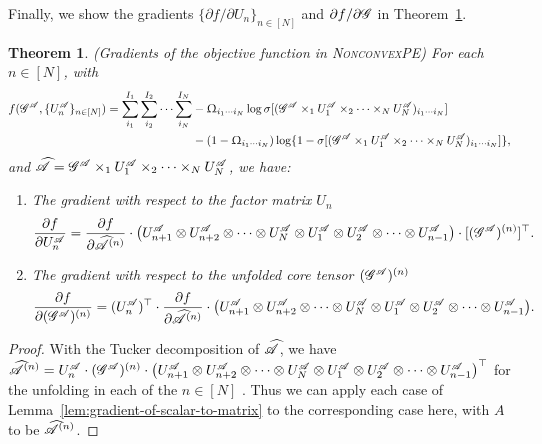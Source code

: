 \documentclass{article}
\newcommand{\T}[2][]{#1\mathscr{\MakeUppercase{#2}}}
\theoremstyle{plain}
\newtheorem{theorem}{Theorem}
\begin{document}
Finally, we show the gradients $\{\partial f / \partial U_n\}_{n \in [N]}$ and $\partial f / \partial \T{G}$ in Theorem~\ref{thm:gradient-of-f}.
\begin{theorem}(Gradients of the objective function in \textsc{NonconvexPE})
	\label{thm:gradient-of-f}
	For each $n \in [N]$, with 
	\begin{equation}
		\begin{aligned}
			f (\T{G}^{\T{A}}, \{U_n^{\T{A}}\}_{n \in [N]}) = \sum_{i_1}^{I_1} \sum_{i_2}^{I_2} \cdots \sum_{i_N}^{I_N} & -\Upomega_{i_1 \cdots i_N} \log \sigma[(\T{G}^{\T{A}} \times_1 U_1^{\T{A}} \times_2 \cdots \times_N U_N^{\T{A}})_{i_1 \cdots i_N}] \\
			& -(1-\Upomega_{i_1 \cdots i_N})\log\{1-\sigma[(\T{G}^{\T{A}} \times_1 U_1^{\T{A}} \times_2 \cdots \times_N U_N^{\T{A}})_{i_1 \cdots i_N}]\},
		\end{aligned}
		\nonumber
	\end{equation}
	and $\widehat{\T{A}} = \T{G}^{\T{A}} \times_1 U_1^{\T{A}} \times_2 \cdots \times_N U_N^{\T{A}}$, we have:
	\begin{enumerate}
		\item The gradient with respect to the factor matrix $U_n$
		\begin{equation}
			\begin{aligned}
				\frac{\partial f}{\partial U_n^{\T{A}}} = \frac{\partial f}{\partial \widehat{\T{A}}^{(n)}} \cdot \big(U_{n+1}^{\T{A}} \otimes U_{n+2}^{\T{A}} \otimes \cdots \otimes U_{N}^{\T{A}} \otimes U_1^{\T{A}} \otimes U_2^{\T{A}} \otimes \cdots \otimes U_{n-1}^{\T{A}} \big) \cdot [(\T{G}^{\T{A}})^{(n)}]^\top.
				\nonumber
			\end{aligned}
		\end{equation}
		\item The gradient with respect to the unfolded core tensor $(\T{G}^{\T{A}})^{(n)}$
		\begin{equation}
			\begin{aligned}
				\frac{\partial f}{\partial (\T{G}^{\T{A}})^{(n)}} = (U_n^{\T{A}})^\top \cdot \frac{\partial f}{\partial \widehat{\T{A}}^{(n)}} \cdot \big(U_{n+1}^{\T{A}} \otimes U_{n+2}^{\T{A}} \otimes \cdots \otimes U_{N}^{\T{A}} \otimes U_1^{\T{A}} \otimes U_2^{\T{A}} \otimes \cdots \otimes U_{n-1}^{\T{A}} \big).
			\end{aligned}
			\nonumber
		\end{equation}
	\end{enumerate}
\end{theorem}
\begin{proof}
	With the Tucker decomposition of $\widehat{\T{A}}$, we have $\widehat{\T{A}}^{(n)} = U_n^{\T{A}} \cdot (\T{G}^{\T{A}})^{(n)} \cdot \big(U_{n+1}^{\T{A}} \otimes U_{n+2}^{\T{A}} \otimes \cdots \otimes U_{N}^{\T{A}} \otimes U_1^{\T{A}} \otimes U_2^{\T{A}} \otimes \cdots \otimes U_{n-1}^{\T{A}} \big)^\top$ for the unfolding in each of the $n \in [N]$ \cite{de2000multilinear}.
	Thus we can apply each case of Lemma~\ref{lem:gradient-of-scalar-to-matrix} to the corresponding case here, with $A$ to be $\widehat{\T{A}}^{(n)}$.  
\end{proof} 
\end{document}
